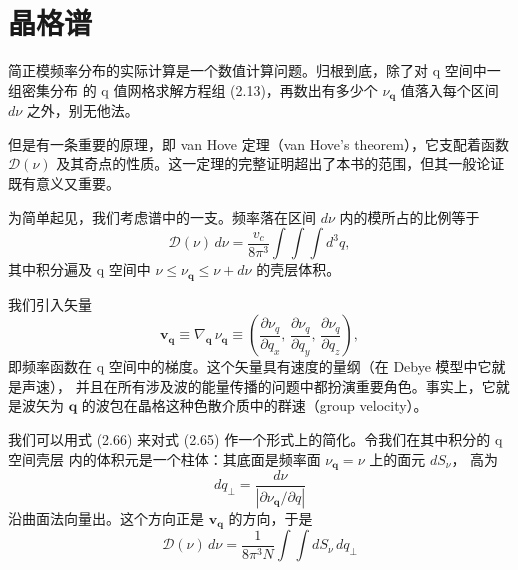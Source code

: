 
\section{晶格谱}

简正模频率分布的实际计算是一个数值计算问题。归根到底，除了对 q 空间中一组密集分布
的 q 值网格求解方程组 (2.13)，再数出有多少个 $\nu_{\mathbf{q}}$ 值落入每个区间
$d\nu$ 之外，别无他法。

但是有一条重要的原理，即 van Hove 定理（van Hove's theorem），它支配着函数
$\mathcal{D}(\nu)$ 及其奇点的性质。这一定理的完整证明超出了本书的范围，但其一般论证
既有意义又重要。

为简单起见，我们考虑谱中的一支。频率落在区间 $d\nu$ 内的模所占的比例等于
\begin{equation*}
\mathcal{D}(\nu)\,d\nu = \frac{v_c}{8\pi^3} \int\!\!\!\int\!\!\!\int d^3 q,
\tag{2.65}
\end{equation*}
其中积分遍及 q 空间中 $\nu \leqslant \nu_{\mathbf{q}} \leqslant \nu + d\nu$
的壳层体积。

我们引入矢量
\begin{equation*}
\mathbf{v}_{\mathbf{q}} \equiv \nabla_{\mathbf{q}}\,\nu_{\mathbf{q}}
\equiv \left( \frac{\partial\nu_q}{\partial q_x},\,
\frac{\partial\nu_q}{\partial q_y},\,
\frac{\partial\nu_q}{\partial q_z} \right),
\tag{2.66}
\end{equation*}
即频率函数在 q 空间中的梯度。这个矢量具有速度的量纲（在 Debye 模型中它就是声速），
并且在所有涉及波的能量传播的问题中都扮演重要角色。事实上，它就是波矢为 $\mathbf{q}$
的波包在晶格这种色散介质中的群速（group velocity）。

我们可以用式 (2.66) 来对式 (2.65) 作一个形式上的简化。令我们在其中积分的 q 空间壳层
内的体积元是一个柱体：其底面是频率面 $\nu_{\mathbf{q}} = \nu$ 上的面元 $dS_\nu$，
高为
\begin{equation*}
dq_\perp = \frac{d\nu}{\left| \partial\nu_{\mathbf{q}}/\partial q \right|}
\tag{2.67}
\end{equation*}
沿曲面法向量出。这个方向正是 $\mathbf{v}_{\mathbf{q}}$ 的方向，于是
\begin{equation*}
\mathcal{D}(\nu)\,d\nu = \frac{1}{8\pi^3 N} \int\!\!\int dS_\nu\, dq_\perp
\tag{2.68}
\end{equation*}


